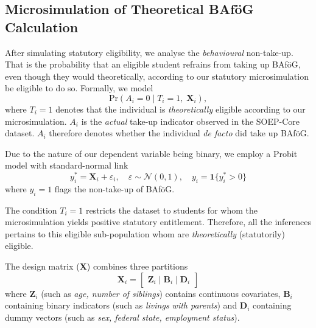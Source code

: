 \subsection{Microsimulation of Theoretical BAföG Calculation}
After simulating statutory eligibility, we analyse the \textit{behavioural} non-take-up.
That is the probability that an eligible student refrains from taking up BAföG, even though they would theoretically, according to our statutory microsimulation be eligible to do so. Formally, we model 
\begin{equation}
  \mathrm{Pr}(A_{i} = 0 \mid T_{i} = 1,\; \mathbf{X}_{i}),
\end{equation}
where \( T_{i} = 1 \) denotes that the individual is \textit{theoretically} eligible according to our microsimulation. \( A_{i} \) is the \textit{actual} take-up indicator observed in the SOEP-Core dataset. 
\( A_{i} \) therefore denotes whether the individual \textit{de facto} did take up BAföG. 

Due to the nature of our dependent variable being binary, we employ a Probit model with standard-normal link
\begin{equation}
  y_{i}^* = \mathbf{X}_{i} + \varepsilon_{i}, 
  \quad 
  \varepsilon \sim \mathcal{N}(0,1), 
  \quad 
  y_{i} = \mathbf{1} \{ y_{i}^* > 0 \}
\end{equation}
where \( y_{i} = 1 \) flags the non-take-up of BAföG. 

The condition \( T_{i} = 1 \) restricts the dataset to students for whom the microsimulation yields positive statutory entitlement. Therefore, all the inferences pertains to this eligible sub-population whom are \textit{theoretically} (statutorily) eligible. 

The design matrix (\( \mathbf{X} \)) combines three partitions 
\begin{equation}
  \mathbf{X}_{i} = 
  \begin{bmatrix}
    \mathbf{Z}_{i} \mid \mathbf{B}_{i} \mid \mathbf{D}_{i}
  \end{bmatrix}
\end{equation}
where \( \mathbf{Z}_{i} \) (such as \textit{age, number of siblings}) contains continuous covariates, \( \mathbf{B}_{i} \) containing binary indicators (such as \textit{livings with parents})  and \( \mathbf{D}_{i} \) containing dummy vectors (such as \textit{sex, federal state, employment status}). 

